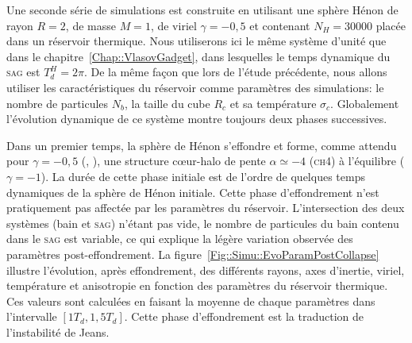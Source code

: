


	Une seconde série de simulations est construite en utilisant une sphère Hénon de rayon $R=2$, de masse $M=1$, de viriel $\gamma=-0,5$ et
	contenant $N_H = 30000$ placée dans un réservoir thermique. Nous utiliserons ici le même système d'unité que dans le
	chapitre~\ref{Chap::VlasovGadget}, dans lesquelles le temps dynamique du \textsc{sag} est $T_d^H = 2\pi$. De la même façon que lors de l'étude
	précédente, nous allons utiliser les caractéristiques du réservoir comme paramètres des simulations: le nombre de particules $N_b$, la taille
	du cube $R_c$ et sa température $\sigma_c$. Globalement l'évolution dynamique de ce système montre toujours deux phases successives.

	Dans un premier temps, la sphère de Hénon s'effondre et forme, comme attendu pour $\gamma=-0,5$ (\citet{roy}, \citet{Joyceetal}), une
	structure cœur-halo de pente $\alpha\simeq-4$ (\textsc{ch4}) à l'équilibre ($\gamma=-1$). La durée de cette phase initiale est de l'ordre de
	quelques temps dynamiques de la sphère de Hénon initiale. Cette phase d'effondrement n'est pratiquement pas affectée par les paramètres du
	réservoir. L'intersection des deux systèmes (bain et \textsc{sag}) n'étant pas vide, le nombre de particules du bain contenu dans le
	\textsc{sag} est variable, ce qui explique la légère variation observée des paramètres post-effondrement. La
	figure~\ref{Fig::Simu::EvoParamPostCollapse} illustre l'évolution, après effondrement, des différents rayons, axes d'inertie, viriel,
	température et anisotropie en fonction des paramètres du réservoir thermique. Ces valeurs sont calculées en faisant la moyenne de chaque
	paramètres dans l'intervalle $[1T_d, 1,5T_d]$. Cette phase d'effondrement est la traduction de l'instabilité de Jeans.

